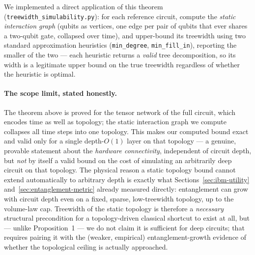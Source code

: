 \documentclass[9pt,twocolumn]{extarticle}
\begin{document}
We implemented a direct application of this theorem
(\texttt{treewidth\_simulability.py}): for each reference circuit, compute
the \emph{static interaction graph} (qubits as vertices, one edge per pair
of qubits that ever shares a two-qubit gate, collapsed over time), and
upper-bound its treewidth using two standard approximation heuristics
(\texttt{min\_degree}, \texttt{min\_fill\_in}), reporting the smaller of
the two --- each heuristic returns a \emph{valid} tree decomposition, so
its width is a legitimate upper bound on the true treewidth regardless of
whether the heuristic is optimal.

\paragraph{The scope limit, stated honestly.} The theorem above is proved
for the tensor network of the full circuit, which encodes time as well as
topology; the static interaction graph we compute collapses all time steps
into one topology. This makes our computed bound exact and valid only for
a single depth-$O(1)$ layer on that topology --- a genuine, provable
statement about the \emph{hardware connectivity}, independent of circuit
depth, but \emph{not} by itself a valid bound on the cost of simulating an
arbitrarily deep circuit on that topology. The physical reason a static
topology bound cannot extend automatically to arbitrary depth is exactly
what Sections~\ref{sec:ibm-utility} and~\ref{sec:entanglement-metric}
already measured directly: entanglement can grow with circuit depth even
on a fixed, sparse, low-treewidth topology, up to the volume-law cap.
Treewidth of the static topology is therefore a \emph{necessary}
structural precondition for a topology-driven classical shortcut to exist
at all, but --- unlike Proposition~1 --- we do not claim it is sufficient
for deep circuits; that requires pairing it with the (weaker, empirical)
entanglement-growth evidence of whether the topological ceiling is
actually approached.
\end{document}
